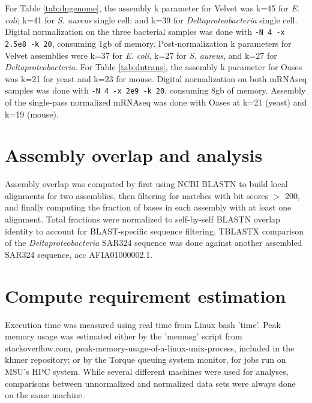 \documentclass{pnastwo}
\begin{document}
\begin{article}
\begin{materials}
For Table \ref{tab:dngenome}, the assembly k parameter for Velvet was
k=45 for {\em E. coli}; k=41 for {\em S. aureus} single cell; and k=39
for {\em Deltaproteobacteria} single cell.  Digital normalization
on the three bacterial samples was done with {\tt -N 4 -x 2.5e8 -k 20},
consuming 1gb of memory.  Post-normalization k parameters for Velvet
assemblies were k=37 for {\em E. coli}, k=27 for {\em S. aureus}, and k=27 for {\em Deltaproteobacteria}.
For Table \ref{tab:dntrans}, the assembly k parameter for Oases was k=21 for yeast
and k=23 for mouse.  Digital normalization on both mRNAseq samples was done
with {\tt -N 4 -x 2e9 -k 20}, consuming 8gb of memory.  Assembly of the
single-pass normalized mRNAseq was done with Oases at k=21 (yeast) and k=19
(mouse).

\section{Assembly overlap and analysis}

Assembly overlap was computed by first using NCBI BLASTN to build local
alignments for two assemblies, then filtering for matches with bit scores
$>$ 200, and finally computing the fraction of bases in each assembly
with at least one alignment.  Total fractions were normalized to
self-by-self BLASTN overlap identity to account for BLAST-specific
sequence filtering.
TBLASTX comparison of the {\em Deltaproteobacteria} SAR324 sequence
was done against another assembled SAR324 sequence, acc AFIA01000002.1.

\section{Compute requirement estimation}

Execution time was measured using real time from Linux bash 'time'.
Peak memory usage was estimated either by the 'memusg' script from
stackoverflow.com, peak-memory-usage-of-a-linux-unix-process, included
in the khmer repository; or by the Torque queuing system monitor, for
jobs run on MSU's HPC system.  While several different machines were
used for analyses, comparisons between unnormalized and normalized
data sets were always done on the same machine.

\end{materials}

\begin{acknowledgments}


\end{acknowledgments}
\end{article}
\end{document}
